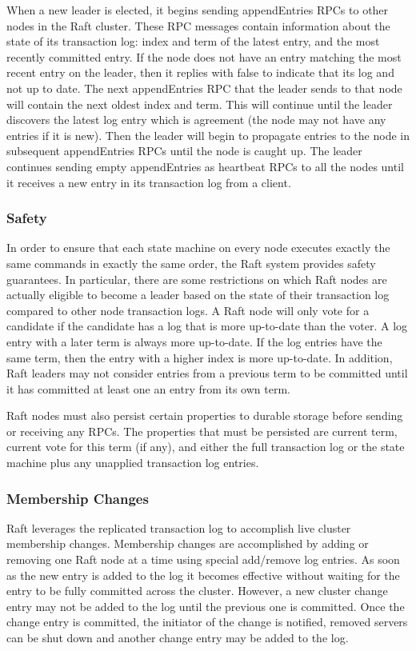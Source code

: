 \documentclass[9pt]{extarticle}
\begin{document}
\begin{multicols}{2}
When a new leader is elected, it begins sending appendEntries RPCs
to other nodes in the Raft cluster. These RPC messages contain
information about the state of its transaction log: index and term of
the latest entry, and the most recently committed entry. If the node
does not have an entry matching the most recent entry on the leader,
then it replies with false to indicate that its log and not up to
date. The next appendEntries RPC that the leader sends to that
node will contain the next oldest index and term. This will continue
until the leader discovers the latest log entry which is agreement
(the node may not have any entries if it is new). Then the leader will
begin to propagate entries to the node in subsequent appendEntries
RPCs until the node is caught up. The leader continues sending
empty appendEntries as heartbeat RPCs to all the nodes until it
receives a new entry in its transaction log from a client.

\subsubsection{Safety}

In order to ensure that each state machine on every node executes
exactly the same commands in exactly the same order, the Raft system
provides safety guarantees. In particular, there are some restrictions
on which Raft nodes are actually eligible to become a leader based on
the state of their transaction log compared to other node transaction
logs. A Raft node will only vote for a candidate if the candidate has
a log that is more up-to-date than the voter. A log entry with a later
term is always more up-to-date. If the log entries have the same term,
then the entry with a higher index is more up-to-date. In addition,
Raft leaders may not consider entries from a previous term to be
committed until it has committed at least one an entry from its own
term.

Raft nodes must also persist certain properties to durable storage
before sending or receiving any RPCs. The properties that must be
persisted are current term, current vote for this term (if any), and
either the full transaction log or the state machine plus any
unapplied transaction log entries.

\subsubsection{Membership Changes}

Raft leverages the replicated transaction log to accomplish live
cluster membership changes. Membership changes are accomplished by
adding or removing one Raft node at a time using special add/remove
log entries. As soon as the new entry is added to the log it becomes
effective without waiting for the entry to be fully committed across
the cluster. However, a new cluster change entry may not be added to
the log until the previous one is committed. Once the change entry is
committed, the initiator of the change is notified, removed servers
can be shut down and another change entry may be added to the log.


\end{multicols}
\end{document}
